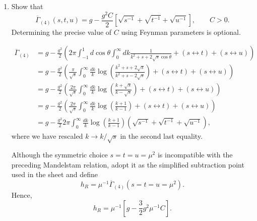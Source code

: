 \begin{enumerate}[label=\alph*)]
    \item Show that
    \begin{equation}
        \overline\Gamma_{(4)}(s,t,u)
        =g-\frac{g^2C}{2}
        \left[
            \sqrt{s^{-1}}+\sqrt{t^{-1}}+\sqrt{u^{-1}}
        \right],
        \qquad C>0.
    \end{equation}
    Determining the precise value of $C$ using Feynman parameters is optional.
    \begin{solution}
        \begin{equation}
            \begin{aligned}
                \overline\Gamma_{(4)} &= g - \frac{g^2}{2}\left( 2\pi\int ^1_{-1}d\cos\theta \int^\infty_0 dk \frac{1}{k^2 + s +2\sqrt{s}\cos\theta} +(s\leftrightarrow t) + (s\leftrightarrow u)\right)\\
                &=g - \frac{g^2}{2}\left( \frac{\pi}{\sqrt{s}} \int^\infty_0\frac{dk}{k} \log\left(\frac{k^2 + s+2\sqrt{s}}{k^2 + s-2\sqrt{s}}\right) +(s\leftrightarrow t) + (s\leftrightarrow u)\right)\\
                &=g - \frac{g^2}{2}\left( \frac{2\pi}{\sqrt{s}} \int^\infty_0\frac{dk}{k} \log\left(\frac{k + \sqrt{s}}{k-\sqrt{s}}\right) +(s\leftrightarrow t) + (s\leftrightarrow u)\right)\\
                &=g - \frac{g^2}{2}\left( \frac{2\pi}{\sqrt{s}} \int^\infty_0\frac{dk}{k} \log\left(\frac{k + 1}{k-1}\right) +(s\leftrightarrow t) + (s\leftrightarrow u)\right)\\
                &=g - \frac{g^2}{2}2\pi\int^\infty_0\frac{dk}{k} \log\left(\frac{k + 1}{k-1}\right)(\sqrt{s^{-1}}+\sqrt{t^{-1}}+\sqrt{u^{-1}}),
            \end{aligned}
        \end{equation}
        where we have rescaled $k \to k/\sqrt{s}$ in the second last equality.
    \end{solution}

    Although the symmetric choice $s=t=u=\mu^2$ is incompatible with the
    preceding Mandelstam relation, adopt it as the simplified subtraction point
    used in the sheet and define
    \begin{equation}
        h_R
        =\mu^{-1}\overline\Gamma_{(4)}
        (s=t=u=\mu^2).
    \end{equation}
    Hence,
    \begin{equation}
        h_R
        =\mu^{-1}
        \left[
            g-\frac{3}{2}g^2\mu^{-1}C
        \right].
    \end{equation}


\end{enumerate}
